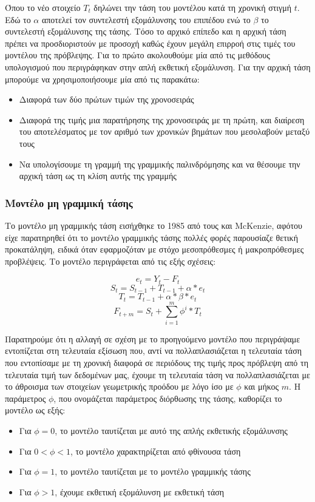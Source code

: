 Όπου το νέο στοιχείο $T_t$ δηλώνει την τάση του μοντέλου κατά τη χρονική στιγμή $t$. Εδώ το $\alpha$ αποτελεί τον συντελεστή εξομάλυνσης του επιπέδου ενώ το $\beta$ το συντελεστή εξομάλυνσης της τάσης. Τόσο το αρχικό επίπεδο και η αρχική τάση πρέπει να προσδιοριστούν με προσοχή καθώς έχουν μεγάλη επιρροή στις τιμές του μοντέλου της πρόβλεψης. Για το πρώτο ακολουθούμε μία από τις μεθόδους υπολογισμού που περιγράφηκαν στην απλή εκθετική εξομάλυνση. Για την αρχική τάση μπορούμε να χρησιμοποιήσουμε μία από τις παρακάτω:

\begin{itemize}
    \item Διαφορά των δύο πρώτων τιμών της χρονοσειράς
    \item Διαφορά της τιμής μια παρατήρησης της χρονοσειράς με τη πρώτη, και διαίρεση του αποτελέσματος με τον αριθμό των χρονικών βημάτων που μεσολαβούν μεταξύ τους 
    \item Να υπολογίσουμε τη γραμμή της γραμμικής παλινδρόμησης και να θέσουμε την αρχική τάση ως τη κλίση αυτής της γραμμής
  \end{itemize}



\subsubsection{Μοντέλο μη γραμμική τάσης}

Το μοντέλο μη γραμμικής τάση εισήχθηκε το 1985 από τους  και {McKenzie}, αφότου είχε παρατηρηθεί ότι το μοντέλο γραμμικής τάσης πολλές φορές παρουσίαζε θετική προκατάληψη, ειδικά όταν εφαρμοζόταν με στόχο μεσοπρόθεσμες ή μακροπρόθεσμες προβλέψεις. Το μοντέλο περιγράφεται από τις εξής σχέσεις:

\[ e_t = Y_t - F_t \]
\[ S_t = S_{t-1} + T_{t-1} + \alpha * e_t \]
\[ T_t =  T_{t-1} + \alpha * \beta * e_t \]
\[ F_{t+m} = S_t + \sum_{i=1}^{m}{\phi^{i}* T_t} \]

Παρατηρούμε ότι η αλλαγή σε σχέση με το προηγούμενο μοντέλο που περιγράψαμε εντοπίζεται στη τελευταία εξίσωση που, αντί να πολλαπλασιάζεται η τελευταία τάση που εντοπίσαμε με τη χρονική διαφορά σε περιόδους της τιμής προς πρόβλεψη από τη τελευταία τιμή των δεδομένων μας, έχουμε τη τελευταία τάση να πολλαπλασιάζεται με το άθροισμα των στοιχείων γεωμετρικής προόδου με λόγο ίσο με $\phi$ και μήκος $m$. Η παράμετρος $\phi$, που ονομάζεται παράμετρος διόρθωσης της τάσης, καθορίζει το μοντέλο ως εξής:

\begin{itemize}
\item Για $\phi = 0$, το μοντέλο ταυτίζεται με αυτό της απλής εκθετικής εξομάλυνσης
\item Για $0 < \phi < 1$, το μοντέλο χαρακτηρίζεται από φθίνουσα τάση
\item Για $\phi = 1$, το μοντέλο ταυτίζεται με το μοντέλο γραμμικής τάσης 
\item Για $\phi > 1$, έχουμε εκθετική εξομάλυνση με εκθετική τάση
\end{itemize}

